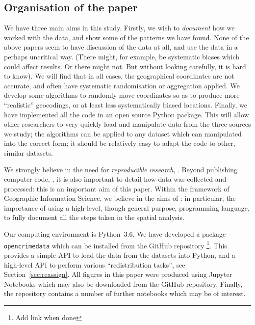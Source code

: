 \documentclass[twoside,a4paper,twocolumn,10pt]{article}
\theoremstyle{plain}
\theoremstyle{definition}
\begin{document}
\subsection{Organisation of the paper}

We have three main aims in this study.  Firstly, we wish to \emph{document} how we worked
with the data, and show some of the patterns we have found.  None of the above papers seem
to have discussion of the data at all, and use the data in a perhaps uncritical way.
(There might, for example, be systematic biases which could affect results.  Or there might not.
But without looking carefully, it is hard to know).  We will find that in all cases, the
geographical coordinates are not accurate, and often have systematic randomisation or aggregation
applied.  We develop some algorithms to randomly move coordinates so as to produce more
``realistic'' geocodings, or at least less systematically biased locations.  Finally, we
have implemented all the code in an open source Python package.  This will allow other researchers
to very quickly load and manipulate data from the three sources we study; the algorithms can
be applied to any dataset which can manipulated into the correct form; it should be relatively
easy to adapt the code to other, similar datasets.

We strongly believe in the need for \emph{reproducible research}, \cite{hl, morin}.
Beyond publishing computer code, \cite{barnes}, it is also important to detail how data was collected
and processed: this is an important aim of this paper.  Within the framework of
Geographic Information Science, we believe in the aims of \cite{ssb}: in particular, the
importance of using a high-level, though general purpose, programming language, to fully
document all the steps taken in the spatial analysis.

Our computing environment is Python~3.6.  We have developed a package \texttt{opencrimedata}
which can be installed from the GitHub repository \footnote{Add link when done}.
This provides a simple API to load the data from the datasets into Python, and a high-level
API to perform various ``redistribution tasks'', see Section~\ref{sec:reassign}.
All figures in this paper were produced using Jupyter Notebooks which may also be downloaded from
the GitHub repository.  Finally, the repository contains a number of further notebooks which may
be of interest.
\end{document}
